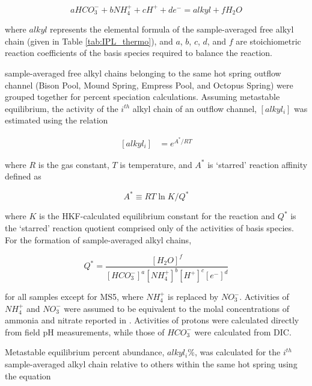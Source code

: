 \begin{equation}
    aHCO_{3}^{-} + bNH_{4}^{+} + cH^{+} + de^{-} = alkyl + fH_{2}O
\end{equation}

\noindent where $alkyl$ represents the elemental formula of the sample-averaged free alkyl chain (given in Table \ref{tab:IPL_thermo}), and $a$, $b$, $c$, $d$, and $f$ are stoichiometric reaction coefficients of the basis species required to balance the reaction.

sample-averaged free alkyl chains belonging to the same hot spring outflow channel (Bison Pool, Mound Spring, Empress Pool, and Octopus Spring) were grouped together for percent speciation calculations. Assuming metastable equilibrium, the activity of the $i^{th}$ alkyl chain of an outflow channel, $[alkyl_{i}]$ was estimated using the relation

\begin{equation} \label{eq:alkyl_activity}
\begin{split}
[alkyl_{i}] & = e^{A^{*}/RT}
\end{split}
\end{equation}

\noindent where $R$ is the gas constant, $T$ is temperature, and $A^{*}$ is `starred' reaction affinity defined as

\begin{equation}
A^{*} \equiv RT\ln{K/Q^{*}}
\end{equation}

\noindent where $K$ is the HKF-calculated equilibrium constant for the reaction and $Q^{*}$ is the `starred' reaction quotient comprised only of the activities of basis species. For the formation of sample-averaged alkyl chains,

\begin{equation}
Q^{*} = \frac{[H_{2}O]^{f}}{[HCO_{3}^{-}]^{a}[NH_{4}^{+}]^{b}[H^{+}]^{c}[e^{-}]^{d}}
\end{equation}

\noindent for all samples except for MS5, where $NH_{4}^{+}$ is replaced by $NO_{3}^{-}$. Activities of $NH_{4}^{+}$ and $NO_{3}^{-}$ were assumed to be equivalent to the molal concentrations of ammonia and nitrate reported in \cite{boyer2018thermophile}. Activities of protons were calculated directly from field pH measurements, while those of $HCO_{3}^{-}$ were calculated from DIC.

Metastable equilibrium percent abundance, $alkyl_{i}\%$, was calculated for the $i^{th}$ sample-averaged alkyl chain relative to others within the same hot spring using the equation

